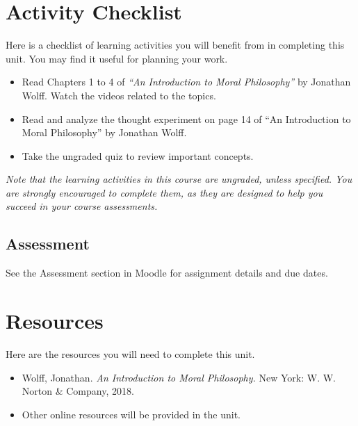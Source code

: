 \documentclass[
]{book}
\providecommand{\tightlist}{%
  \setlength{\itemsep}{0pt}\setlength{\parskip}{0pt}}
\begin{document}
\hypertarget{activity-checklist}{%
\section*{Activity Checklist}\label{activity-checklist}}

Here is a checklist of learning activities you will benefit from in completing this unit. You may find it useful for planning your work.

\begin{itemize}
\tightlist
\item
  Read Chapters 1 to 4 of \emph{``An Introduction to Moral Philosophy''} by Jonathan Wolff. Watch the videos related to the topics.
\item
  Read and analyze the thought experiment on page 14 of ``An Introduction to Moral Philosophy'' by Jonathan Wolff.
\item
  Take the ungraded quiz to review important concepts.
\end{itemize}

\emph{Note that the learning activities in this course are ungraded, unless specified. You are strongly encouraged to complete them, as they are designed to help you succeed in your course assessments.}

\hypertarget{assessment}{%
\subsection*{Assessment}\label{assessment}}

See the Assessment section in Moodle for assignment details and due dates.

\hypertarget{resources}{%
\section*{Resources}\label{resources}}

Here are the resources you will need to complete this unit.

\begin{itemize}
\item
  Wolff, Jonathan. \emph{An Introduction to Moral Philosophy.} New York: W. W. Norton \& Company, 2018.
\item
  Other online resources will be provided in the unit.
\end{itemize}
\end{document}
